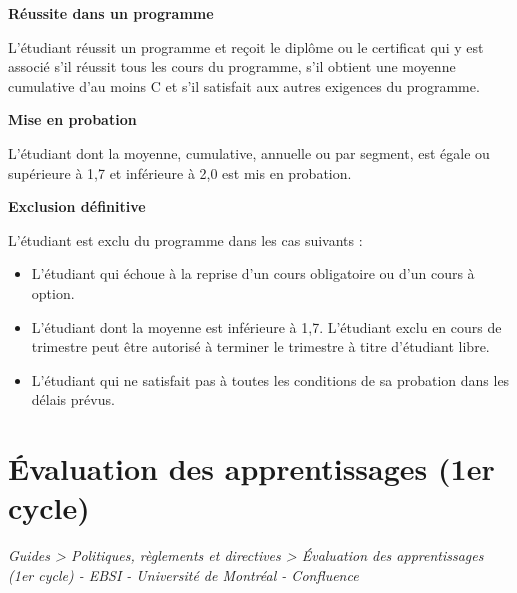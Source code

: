 \documentclass [12 pt]{article}
\begin{document}
        \textbf{
        Réussite dans un programme
        }
    
            L'étudiant réussit un programme et reçoit le diplôme ou le certificat qui y est
                associé s'il réussit tous les cours du programme, s'il obtient une moyenne
                cumulative d'au moins C et s'il satisfait aux autres exigences du programme.
            
        \textbf{
        Mise en probation
        }
    
            L'étudiant dont la moyenne, cumulative, annuelle ou par segment, est égale ou
                supérieure à 1,7 et inférieure à 2,0 est mis en probation.
            
        \textbf{
        Exclusion définitive
        }
    
            L'étudiant est exclu du programme dans les cas suivants :
            
        \begin{itemize}
        
                
        \item L'étudiant qui échoue à la reprise d'un cours obligatoire ou d'un cours à
                    option.
                
        \item L'étudiant dont la moyenne est inférieure à 1,7. L'étudiant exclu en cours de
                    trimestre peut être autorisé à terminer le trimestre à titre d'étudiant
                    libre.
                
        \item L'étudiant qui ne satisfait pas à toutes les conditions de sa probation dans les
                    délais prévus.
            
        \end{itemize}
    
        
    
    
        \newpage
        \section {
        Évaluation des apprentissages (1er cycle)
        }
        
        
        
        \textit{
        Guides > Politiques, règlements et directives > Évaluation des apprentissages
            (1er cycle) - EBSI - Université de Montréal - Confluence
        }
    
\end{document}
